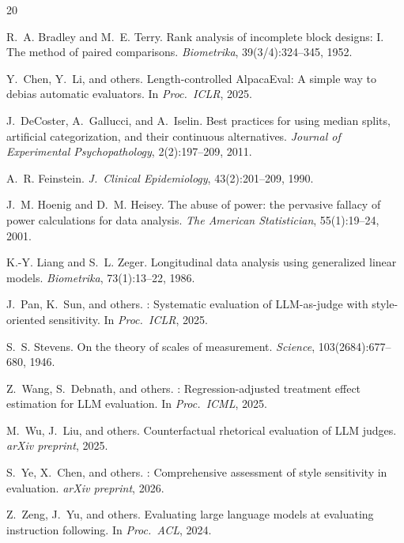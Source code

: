 \documentclass[10pt,twocolumn]{article}
\begin{document}

\begin{thebibliography}{20}

R.~A. Bradley and M.~E. Terry.
\newblock Rank analysis of incomplete block designs: {I}. {T}he method of paired comparisons.
\newblock \textit{Biometrika}, 39(3/4):324--345, 1952.

Y.~Chen, Y.~Li, and others.
\newblock Length-controlled {AlpacaEval}: A simple way to debias automatic evaluators.
\newblock In \textit{Proc.\ ICLR}, 2025.

J.~DeCoster, A.~Gallucci, and A.~Iselin.
\newblock Best practices for using median splits, artificial categorization, and their continuous alternatives.
\newblock \textit{Journal of Experimental Psychopathology}, 2(2):197--209, 2011.

A.~R. Feinstein.
\newblock \textit{J.\ Clinical Epidemiology}, 43(2):201--209, 1990.

J.~M. Hoenig and D.~M. Heisey.
\newblock The abuse of power: the pervasive fallacy of power calculations for data analysis.
\newblock \textit{The American Statistician}, 55(1):19--24, 2001.

K.-Y. Liang and S.~L. Zeger.
\newblock Longitudinal data analysis using generalized linear models.
\newblock \textit{Biometrika}, 73(1):13--22, 1986.

J.~Pan, K.~Sun, and others.
: Systematic evaluation of {LLM}-as-judge with style-oriented sensitivity.
\newblock In \textit{Proc.\ ICLR}, 2025.

S.~S. Stevens.
\newblock On the theory of scales of measurement.
\newblock \textit{Science}, 103(2684):677--680, 1946.

Z.~Wang, S.~Debnath, and others.
: Regression-adjusted treatment effect estimation for {LLM} evaluation.
\newblock In \textit{Proc.\ ICML}, 2025.

M.~Wu, J.~Liu, and others.
\newblock Counterfactual rhetorical evaluation of {LLM} judges.
\newblock \textit{arXiv preprint}, 2025.

S.~Ye, X.~Chen, and others.
: Comprehensive assessment of style sensitivity in evaluation.
\newblock \textit{arXiv preprint}, 2026.

Z.~Zeng, J.~Yu, and others.
\newblock Evaluating large language models at evaluating instruction following.
\newblock In \textit{Proc.\ ACL}, 2024.

\end{thebibliography}
\end{document}
